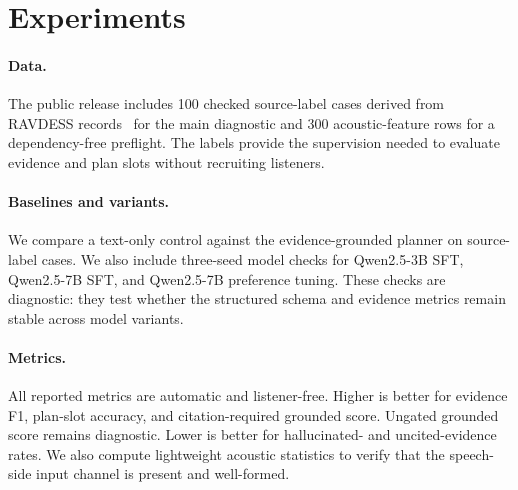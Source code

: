 \documentclass{article}
\begin{document}
\section{Experiments}
\paragraph{Data.}
The public release includes 100 checked source-label cases derived from RAVDESS records~\citep{ravdess2018} for the main diagnostic and 300 acoustic-feature rows for a dependency-free preflight. The labels provide the supervision needed to evaluate evidence and plan slots without recruiting listeners.

\paragraph{Baselines and variants.}
We compare a text-only control against the evidence-grounded planner on source-label cases. We also include three-seed model checks for Qwen2.5-3B SFT, Qwen2.5-7B SFT, and Qwen2.5-7B preference tuning. These checks are diagnostic: they test whether the structured schema and evidence metrics remain stable across model variants.

\paragraph{Metrics.}
All reported metrics are automatic and listener-free. Higher is better for evidence F1, plan-slot accuracy, and citation-required grounded score. Ungated grounded score remains diagnostic. Lower is better for hallucinated- and uncited-evidence rates. We also compute lightweight acoustic statistics to verify that the speech-side input channel is present and well-formed.

\begin{table}[t]
\centering

\caption{Source-label diagnostic on 100 paired cases. Upper-bound reconstruction exposes the text-only gap on process metrics.}
\label{tab:source-label}
\end{table}

\begin{table}[t]
\centering

\caption{Three-seed listener-free model checks. Evidence citation remains exact in this subset, while plan-slot accuracy reveals the main remaining modeling weakness.}
\label{tab:model-checks}
\end{table}
\end{document}
